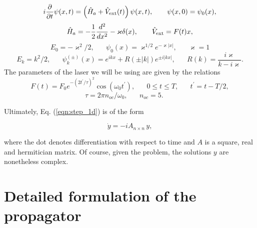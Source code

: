 \documentclass[10pt]{article}
\begin{document}
\begin{equation}
	i\frac{\partial}{\partial t}\psi(x,t)
	   = \left( \hat{H}_a + \hat{V}_{\rm ext}(t)\right) 
	   \psi(x,t),   \hspace{20pt}\psi(x,0)=\psi_0(x),  \label{eqn:step_1d}
\end{equation}
\begin{equation}
  \hat{H}_a = -\frac{1}{2}\frac{d^2}{dx^2} - \varkappa\delta(x), \hspace{20pt}
  \hat{V}_{\rm ext} = F(t)x,
\end{equation}
\begin{equation}
  E_0 = -\varkappa^2/2,\hspace{20pt}
  \psi_{0}(x) = \varkappa^{1/2}e^{-\varkappa|x|}, \hspace{20pt}
  \varkappa = 1       \label{eqn:bound_state_s}
\end{equation}
\begin{equation}
  E_k = k^2/2,\hspace{20pt}
  \psi_k^{(\pm)}(x) = e^{ikx} + R(\pm|k|)e^{\pm i|kx|}, \hspace{20pt}
   R(k) = \frac{i\varkappa}{k-i \varkappa}. \label{eqn:inout_states}
\end{equation}
\vspace{10pt}
The parameters of the laser we will be using 
are given by the relations
\begin{equation}
  F(t) = F_0 e^{-(2t^\prime/\tau)^2}\cos(\omega_0 t^\prime),
\hspace{20pt}  0 \leqslant t \leqslant T,
\hspace{20pt}  t^{\prime} = t - T/2,
\end{equation}
\begin{equation}
  \tau  = 2\pi n_{oc}/\omega_0,  \hspace{20pt}
  n_{oc} = 5. \hspace{20pt}
\end{equation}

Ultimately, Eq. (\ref{eqn:step_1d}) is of the form 

\begin{equation}
 \dot{y} = -i A_{n\times n}\,y,
\end{equation}

where the dot denotes differentiation with respect to time and $A$
is a square, real and hermitician matrix. Of course, given the problem, the 
solutions $y$ are nonetheless complex.
\newpage

\section{Detailed formulation of the propagator}
\end{document}
